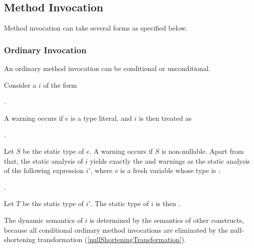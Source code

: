 \documentclass[makeidx]{article}
\begin{document}
{\subsection{Method Invocation}

\LMHash{}%
Method invocation can take several forms as specified below.


\subsubsection{Ordinary Invocation}

\LMHash{}%
An ordinary method invocation can be conditional or unconditional.

\LMHash{}%
Consider a
$i$ of the form

\noindent
{}.


\LMHash{}%
A warning occurs if $e$ is a type literal,
and $i$ is then treated as

\noindent
{}.

\LMHash{}%
Let $S$ be the static type of $e$.
A warning occurs if $S$ is non-nullable.
Apart from that,
the static analysis of $i$ yields
exactly the  and warnings as
the static analysis of the following expression $i'$,
where $v$ is a fresh variable whose type is :

\noindent
{}.

\noindent
Let $T$ be the static type of $i'$.
The static type of $i$ is then .

\LMHash{}%
The dynamic semantics of $i$ is determined by the semantics of other constructs,
because all conditional ordinary method invocations are eliminated by the
null-shortening transformation
(\ref{nullShorteningTransformation}).
\EndCase

}
\end{document}
